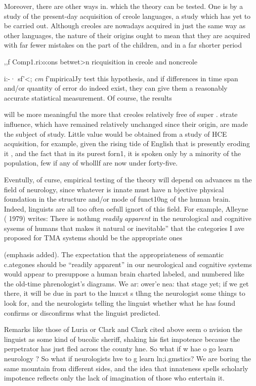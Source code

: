 Moreover, there are other ways in. which the theory can be tested. One is by a study of the present-day acquisition of creole languages, a study which has yet to be carried out. Although creoles are nowadays acquired in just the same way as other languages, the nature of their origins ought to mean that they are acquired with far fewer mistakes on the part of the children, and in a far shorter period

,,f Comp1.ri:o:ons betwet{\textgreater}n ricquisition in creole and noncreole

i:-· sf'{\textless}; \textit{cm} f'mpiricalJy test this hypothesis, and if differences in time span and/or quantity of error do indeed exist, they can give them a reasonably accurate statistical measurement. Of course, the results

will be more meaningful the more that creoles relatively free of super . strate influence, which have remained relatively unchanged since their origin, are made the subject of study. Little value would be obtained from a study of HCE acquisition, for example, given the rising tide of English that is presently eroding it , and the fact that in its purest forn1, it is spoken only by a minority of the population, few if any of wholllf are now under forty-five.


Eventully, of curse, empirical testing of the theory will depend on advances m the field of neurology, since whatever is innate must have n bjective physical foundation in the structure and/or mode of funct10ng of the human brain. Indeed, linguists are all too often oefull ignort of this field. For example, Alleyne ( 1979) writes: There is nothmg \textit{readily} \textit{apparent} in the neurological and cognitive sysems of humans that makes it natural or inevitable'' that the cate\-gories I ave proposed for TMA systems should be the appropriate ones

(emphasis added). The expectation that the appropriateness of semantic c.ategones should be ``readily apparent'' in our neurological and cogni\-tive systems would appear to presuppose a human brain charted labeled, and numbered like the old-time phrenologist's diagrams. We ar: ower'e nea: that stage yet; if we get there, it will be due in part to the lmu:st s tlhng the neurologist some things to look for, and the neurologists telling the linguist whether what he has found confirms or disconfirms what the linguist predicted.

Remarks like those of Luria or Clark and Clark cited above seem o nvision the linguist as some kind of bucolic sheriff, shaking his fist impotence because the perpetrator has just fled across the county hne. So what if w hae o go learn neurology ? So what if neurologists hve to g learn ln;i.gmstics? We are boring the same mountain from different sides, and the idea that innateness spells scholarly impotence
reflects only the lack of imagination of those who entertain it.

